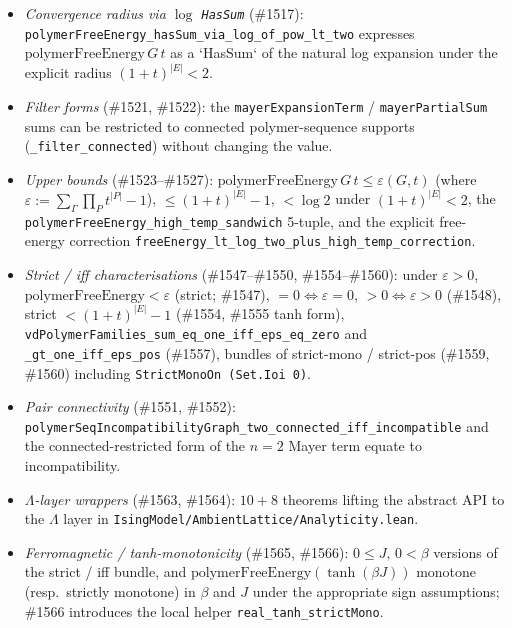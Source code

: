\documentclass[a4paper,11pt]{article}
\begin{document}
\begin{itemize}
  \item \emph{Convergence radius via $\log$ \texttt{HasSum}}
    (\#1517): \texttt{polymerFreeEnergy\_hasSum\_via\_log\_of\_pow\_lt\_two}
    expresses $\mathrm{polymerFreeEnergy}\,G\,t$ as a `HasSum` of
    the natural log expansion under the explicit radius
    $(1+t)^{|E|} < 2$.
  \item \emph{Filter forms} (\#1521, \#1522): the
    \texttt{mayerExpansionTerm} / \texttt{mayerPartialSum} sums
    can be restricted to connected polymer-sequence supports
    (\texttt{\_filter\_connected}) without changing the value.
  \item \emph{Upper bounds} (\#1523--\#1527):
    $\mathrm{polymerFreeEnergy}\,G\,t \le \varepsilon(G,t)$
    (where $\varepsilon := \sum_\Gamma \prod_P t^{|P|} - 1$),
    $\le (1+t)^{|E|} - 1$, $< \log 2$ under
    $(1+t)^{|E|} < 2$, the
    \texttt{polymerFreeEnergy\_high\_temp\_sandwich} 5-tuple, and
    the explicit free-energy correction
    \texttt{freeEnergy\_lt\_log\_two\_plus\_high\_temp\_correction}.
  \item \emph{Strict / iff characterisations}
    (\#1547--\#1550, \#1554--\#1560): under $\varepsilon > 0$,
    $\mathrm{polymerFreeEnergy} < \varepsilon$ (strict; \#1547),
    $= 0 \iff \varepsilon = 0$, $> 0 \iff \varepsilon > 0$
    (\#1548), strict $< (1+t)^{|E|} - 1$ (\#1554, \#1555 tanh
    form), \texttt{vdPolymerFamilies\_sum\_eq\_one\_iff\_eps\_eq\_zero}
    and \texttt{\_gt\_one\_iff\_eps\_pos} (\#1557), bundles of
    strict-mono / strict-pos (\#1559, \#1560)
    including \texttt{StrictMonoOn (Set.Ioi 0)}.
  \item \emph{Pair connectivity} (\#1551, \#1552):
    \texttt{polymerSeqIncompatibilityGraph\_two\_connected\_iff\_incompatible}
    and the connected-restricted form of the $n=2$ Mayer term
    equate to incompatibility.
  \item \emph{$\Lambda$-layer wrappers} (\#1563, \#1564):
    $10 + 8$ theorems lifting the abstract API to the
    $\Lambda$ layer in
    \texttt{IsingModel/AmbientLattice/Analyticity.lean}.
  \item \emph{Ferromagnetic / tanh-monotonicity} (\#1565, \#1566):
    $0 \le J,\, 0 < \beta$ versions of the strict / iff bundle, and
    $\mathrm{polymerFreeEnergy}(\tanh(\beta J))$ monotone (resp.\
    strictly monotone) in $\beta$ and $J$ under the appropriate
    sign assumptions; \#1566 introduces the local helper
    \texttt{real\_tanh\_strictMono}.
\end{itemize}
\end{document}
